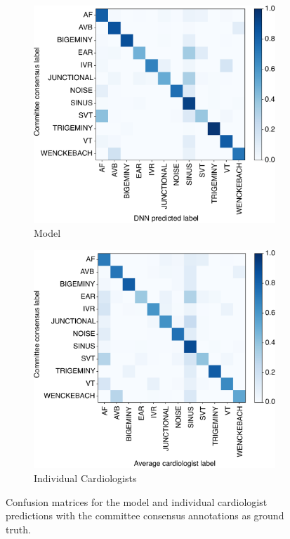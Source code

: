 \begin{figure}
\begin{subfigure}{.5\textwidth}
  \centering
  \includegraphics[width=0.9\linewidth]{arrhythmias/figures/model_confusions.pdf}
  \caption{Model}
  \label{fig:arrhythmias:model_confusion}
\end{subfigure}
\begin{subfigure}{.5\textwidth}
  \centering
  \includegraphics[width=0.9\linewidth]{arrhythmias/figures/human_confusions.pdf}
  \caption{Individual Cardiologists}
  \label{fig:arrhythmias:human_confusion}
\end{subfigure}
\caption{Confusion matrices for the model and individual cardiologist
         predictions with the committee consensus annotations as ground
         truth.}
\end{figure}

